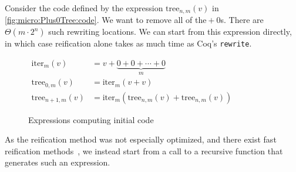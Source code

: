 Consider the code defined by the expression $\text{tree}_{n,m}(v)$ in \autoref{fig:micro:Plus0Tree:code}.
We want to remove all of the${}+0$s.
There are $\Theta(m \cdot 2^n)$ such rewriting locations.
We can start from this expression directly, in which case reification alone takes as much time as Coq's \texttt{rewrite}.
\begin{figure}
{\small $\begin{aligned}
\text{iter}_m(v) & = v + \underbrace{0 + 0 + \cdots + 0}_m \\
\text{tree}_{0,m}(v) &= \text{iter}_m(v + v) \\
\text{tree}_{n+1,m}(v) &= \text{iter}_m(\text{tree}_{n,m}(v) + \text{tree}_{n,m}(v))
\end{aligned}$}%
\caption{\label{fig:micro:Plus0Tree:code}Expressions computing initial code}
\end{figure}
As the reification method was not especially optimized, and there exist fast reification methods~\cite{reification-by-parametricity}, we instead start from a call to a recursive function that generates such an expression.


